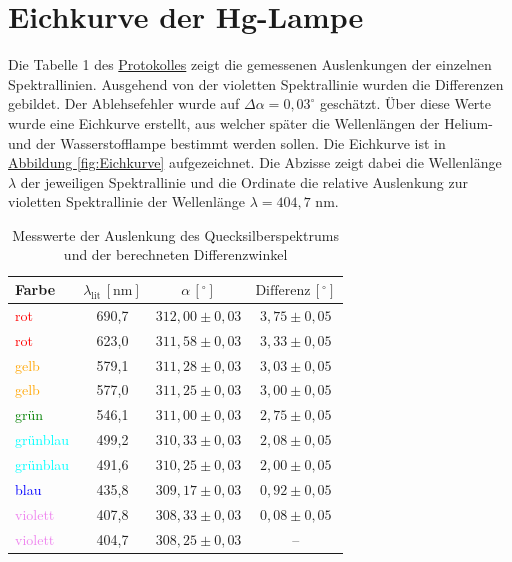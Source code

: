 \twocolumn

\section{Eichkurve der Hg-Lampe}
Die Tabelle 1 des \hyperref[Protokoll]{Protokolles} zeigt die gemessenen Auslenkungen der einzelnen Spektrallinien. Ausgehend von der violetten Spektrallinie wurden die Differenzen gebildet. Der Ablehsefehler wurde auf $\Delta \alpha = 0,03 ^\circ$ geschätzt. Über diese Werte wurde eine Eichkurve erstellt, aus welcher später die Wellenlängen der Helium- und der Wasserstofflampe bestimmt werden sollen. Die Eichkurve ist in \hyperref[fig:Eichkurve]{Abbildung \ref*{fig:Eichkurve}} aufgezeichnet. Die Abzisse zeigt dabei die Wellenlänge $\lambda$ der jeweiligen Spektrallinie und die Ordinate die relative Auslenkung zur violetten Spektrallinie der Wellenlänge $\lambda = 404,7$ nm.
\begin{table}[h!]
    \centering
    \label{tab:quecksilber_spektrum}
    \hspace{-1.2cm}
    \begin{tabular}{lccc}
        \hline
        \textbf{Farbe} & \(\lambda_{\text{lit}}\, [\text{nm}]\) & \(\alpha \,[^\circ]\) & \(\text{Differenz}\,[^\circ]\) \\
        \hline
        \textcolor{red}{rot} & 690,7 & \(312,00 \pm 0,03\) & \(3,75 \pm 0,05\) \\
        \textcolor{red}{rot} & 623,0 & \(311,58 \pm 0,03\) & \(3,33 \pm 0,05\) \\
    \textcolor{orange}{gelb} & 579,1 & \(311,28 \pm 0,03\) & \(3,03 \pm 0,05\) \\
    \textcolor{orange}{gelb} & 577,0 & \(311,25 \pm 0,03\) & \(3,00 \pm 0,05\) \\
    \textcolor{green}{grün} & 546,1 & \(311,00 \pm 0,03\) & \(2,75 \pm 0,05\) \\
    \textcolor{cyan}{grünblau} & 499,2 & \(310,33 \pm 0,03\) & \(2,08 \pm 0,05\) \\
    \textcolor{cyan}{grünblau} & 491,6 & \(310,25 \pm 0,03\) & \(2,00 \pm 0,05\) \\
    \textcolor{blue}{blau} & 435,8 & \(309,17 \pm 0,03\) & \(0,92 \pm 0,05\) \\
    \textcolor{violet}{violett} & 407,8 & \(308,33 \pm 0,03\) & \(0,08 \pm 0,05\) \\
    \textcolor{violet}{violett} & 404,7 & \(308,25 \pm 0,03\) & -- \\
    \hline
\end{tabular}
\caption{Messwerte der Auslenkung des Quecksilberspektrums und der berechneten Differenzwinkel}
\end{table}

